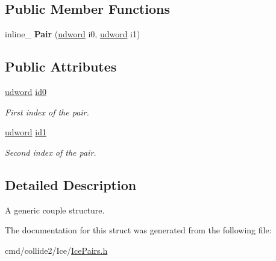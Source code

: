 \subsection*{Public Member Functions}
\begin{DoxyCompactItemize}
\item 
inline\+\_\+ {\bfseries Pair} (\hyperlink{IceTypes_8h_a44c6f1920ba5551225fb534f9d1a1733}{udword} i0, \hyperlink{IceTypes_8h_a44c6f1920ba5551225fb534f9d1a1733}{udword} i1)\hypertarget{structPair_a9d050447f56957e6cdbbad4e58cc76c4}{}\label{structPair_a9d050447f56957e6cdbbad4e58cc76c4}

\end{DoxyCompactItemize}
\subsection*{Public Attributes}
\begin{DoxyCompactItemize}
\item 
\hyperlink{IceTypes_8h_a44c6f1920ba5551225fb534f9d1a1733}{udword} \hyperlink{structPair_ac322047a2105554ef5e41472f35bea6e}{id0}\hypertarget{structPair_ac322047a2105554ef5e41472f35bea6e}{}\label{structPair_ac322047a2105554ef5e41472f35bea6e}

\begin{DoxyCompactList}\small\item\em First index of the pair. \end{DoxyCompactList}\item 
\hyperlink{IceTypes_8h_a44c6f1920ba5551225fb534f9d1a1733}{udword} \hyperlink{structPair_adce5fd1cb330c0c528a81ace7f5d9abc}{id1}\hypertarget{structPair_adce5fd1cb330c0c528a81ace7f5d9abc}{}\label{structPair_adce5fd1cb330c0c528a81ace7f5d9abc}

\begin{DoxyCompactList}\small\item\em Second index of the pair. \end{DoxyCompactList}\end{DoxyCompactItemize}


\subsection{Detailed Description}
A generic couple structure. 

The documentation for this struct was generated from the following file\+:\begin{DoxyCompactItemize}
\item 
cmd/collide2/\+Ice/\hyperlink{IcePairs_8h}{Ice\+Pairs.\+h}\end{DoxyCompactItemize}
